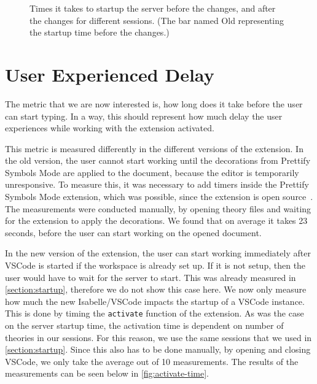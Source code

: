 \begin{figure}[!ht]
\centering
{}
\caption{Times it takes to startup the server before the changes, and after the changes for different sessions. (The bar named Old representing the startup time before the changes.)}
\label{fig:startup-time}
\end{figure}


\section{User Experienced Delay}
\label{section:delay}
The metric that we are now interested is, how long does it take before the user can start typing. In a way, this should represent how much delay the user experiences while working with the extension activated. 

This metric is measured differently in the different versions of the extension. In the old version, the user cannot start working until the decorations from Prettify Symbols Mode are applied to the document, because the editor is temporarily unresponsive. To measure this, it was necessary to add timers inside the Prettify Symbols Mode extension, which was possible, since the extension is open source~\parencite{psm}. The measurements were conducted manually, by opening theory files and waiting for the extension to apply the decorations. We found that on average it takes 23 seconds, before the user can start working on the opened document.

In the new version of the extension, the user can start working immediately after VSCode is started if the workspace is already set up. If it is not setup, then the user would have to wait for the server to start. This was already measured in \autoref{section:startup}, therefore we do not show this case here. We now only measure how much the new Isabelle/VSCode impacts the startup of a VSCode instance. This is done by timing the \texttt{activate} function of the extension. As was the case on the server startup time, the activation time is dependent on number of theories in our sessions. For this reason, we use the same sessions that we used in \autoref{section:startup}. Since this also has to be done manually, by opening and closing VSCode, we only take the average out of 10 measurements. The results of the measurements can be seen below in \autoref{fig:activate-time}.

